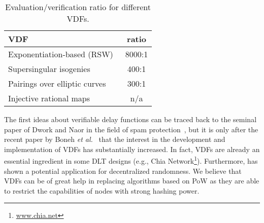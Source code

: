\documentclass[../main.tex]{subfiles}
\begin{document}
\begin{table}[h]
\centering
\begin{tabular}{@{}lc@{}}
\toprule
 \textbf{VDF}                               & \textbf{ratio}  \\ \midrule
 Exponentiation-based (RSW)~\cite{dwork1993, pietrzak2018}  & 8000:1 \\
 Supersingular isogenies~\cite{defeo2019}   & 400:1     \\
 Pairings over elliptic curves              & 300:1     \\
 Injective rational maps~\cite{boneh2018}   & n/a       \\ \bottomrule
\end{tabular}
\caption{Evaluation/verification ratio for different VDFs.}
\label{tab:vdf}
\end{table}

The first ideas about verifiable delay functions can be traced back to the seminal paper of Dwork and Naor in the field of spam protection~\cite{dwork1993}, but it is only after the recent paper by Boneh \textit{et al.}~\cite{boneh2018} that the interest in the development and implementation of VDFs has substantially increased. In fact, VDFs are already an essential ingredient in some DLT designs (e.g., Chia Network\footnote{\url{www.chia.net}}). Furthermore, \cite{boneh2018} has shown a potential application for decentralized randomness.
We believe that VDFs can be of great help in replacing algorithms based on PoW as they are able to restrict the capabilities of nodes with strong hashing power.

\end{document}

